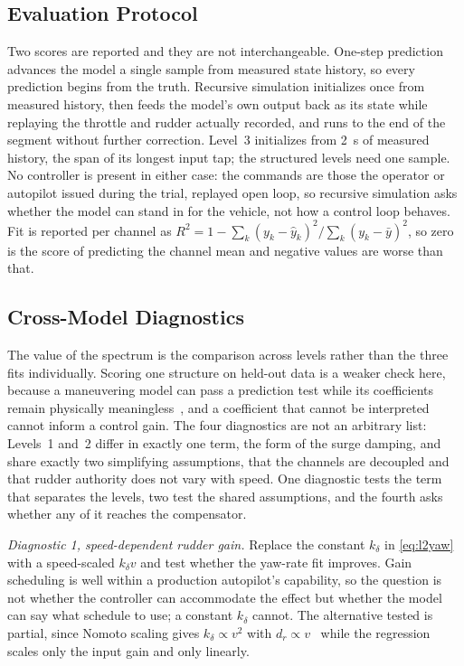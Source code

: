 \documentclass[conference]{IEEEtran}
\begin{document}
\subsection{Evaluation Protocol}

Two scores are reported and they are not interchangeable. One-step prediction advances the model a single sample from measured state history, so every prediction begins from the truth. Recursive simulation initializes once from measured history, then feeds the model's own output back as its state while replaying the throttle and rudder actually recorded, and runs to the end of the segment without further correction. Level~3 initializes from 2~s of measured history, the span of its longest input tap; the structured levels need one sample. No controller is present in either case: the commands are those the operator or autopilot issued during the trial, replayed open loop, so recursive simulation asks whether the model can stand in for the vehicle, not how a control loop behaves. Fit is reported per channel as $R^2 = 1-\sum_k(y_k-\hat y_k)^2/\sum_k(y_k-\bar y)^2$, so zero is the score of predicting the channel mean and negative values are worse than that.

\subsection{Cross-Model Diagnostics}

The value of the spectrum is the comparison across levels rather than the three fits individually. Scoring one structure on held-out data is a weaker check here, because a maneuvering model can pass a prediction test while its coefficients remain physically meaningless~\cite{alexandersson2022system}, and a coefficient that cannot be interpreted cannot inform a control gain. The four diagnostics are not an arbitrary list: Levels~1 and~2 differ in exactly one term, the form of the surge damping, and share exactly two simplifying assumptions, that the channels are decoupled and that rudder authority does not vary with speed. One diagnostic tests the term that separates the levels, two test the shared assumptions, and the fourth asks whether any of it reaches the compensator.

\emph{Diagnostic 1, speed-dependent rudder gain.} Replace the constant $k_\delta$ in \eqref{eq:l2yaw} with a speed-scaled $k_\delta v$ and test whether the yaw-rate fit improves. Gain scheduling is well within a production autopilot's capability, so the question is not whether the controller can accommodate the effect but whether the model can say what schedule to use; a constant $k_\delta$ cannot. The alternative tested is partial, since Nomoto scaling gives $k_\delta\propto v^2$ with $d_r\propto v$~\cite{fossen2011handbook} while the regression scales only the input gain and only linearly.
\end{document}

